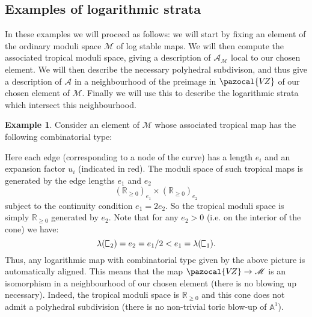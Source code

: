 \documentclass[11pt]{amsart}
\newcommand{\sqC}{\scalebox{0.8}[1.3]{$\sqsubset$}}
\newcommand{\PP}{\mathbb P}
\newcommand{\VZ}{\pazocal{V\!Z}}
\renewcommand{\to}{\rightarrow}
\newcommand{\Aaff}{\mathbb{A}}
\newcommand{\Acal}{\mathcal{A}}
\newcommand{\Mcal}{\mathcal{M}}
\newcommand{\RR}{\mathbb{R}}
\theoremstyle{definition}
\theoremstyle{definition}
\newtheorem{example}[thm]{Example}
\begin{document}
\subsection{Examples of logarithmic strata} In these examples we will proceed as follows: we will start by fixing an element of the ordinary moduli space $\Mcal$ of log stable maps. We will then compute the associated tropical moduli space, giving a description of $\Acal_\Mcal$ local to our chosen element. We will then describe the necessary polyhedral subdivison, and thus give a description of $\Acal$ in a neighbourhood of the preimage in $\VZ$ of our chosen element of $\Mcal$. Finally we will use this to describe the logarithmic strata which intersect this neighbourhood.
\begin{example} Consider an element of $\Mcal$ whose associated tropical map has the following combinatorial type:
\begin{center}
\end{center}
Here each edge (corresponding to a node of the curve) has a length $e_i$ and an expansion factor $u_i$ (indicated in red). The moduli space of such tropical maps is generated by the edge lengths $e_1$ and $e_2$
\begin{equation*} (\RR_{\geq 0})_{e_1} \times (\RR_{\geq 0})_{e_2} \end{equation*}
subject to the continuity condition $e_1=2e_2$. So the tropical moduli space is simply $\RR_{\geq 0}$ generated by $e_2$. Note that for any $e_2 > 0$ (i.e. on the interior of the cone) we have:
\begin{equation*} \lambda(\sqC_2) = e_2 = e_1/2 < e_1 = \lambda(\sqC_1). \end{equation*}
Thus, any logarithmic map with combinatorial type given by the above picture is automatically aligned. This means that the map $\VZ \to \Mcal$ is an isomorphism in a neighbourhood of our chosen element (there is no blowing up necessary). Indeed, the tropical moduli space is $\RR_{\geq 0}$ and this cone does not admit a polyhedral subdivision (there is no non-trivial toric blow-up of $\Aaff^1$).
\end{example}
\end{document}
